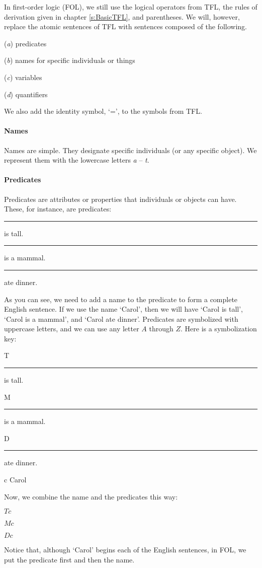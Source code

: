 In first-order logic (FOL), we still use the logical operators from TFL, the rules of derivation given in chapter \ref{s:BasicTFL}, and parentheses. We will, however, replace the atomic sentences of TFL with sentences composed of the following.

\begin{ebullet}
	\item[(\textit{a})] predicates
	\item[(\textit{b})] names for specific individuals or things 
	\item[(\textit{c})] variables 
	\item[(\textit{d})] quantifiers
\end{ebullet}
We also add the identity symbol, ‘=’, to the symbols from TFL.  


\paragraph{Names}

Names are simple. They designate specific individuals (or any specific object). We represent them with the lowercase letters \textit{a} -- \textit{t}.

\paragraph{Predicates}

Predicates are attributes or properties that individuals or objects can have. These, for instance, are predicates:

\begin{ebullet}
	\item[] \rule{1cm}{0.15mm} is tall.
	\item[] \rule{1cm}{0.15mm} is a mammal.
	\item[] \rule{1cm}{0.15mm} ate dinner.
\end{ebullet}

As you can see, we need to add a name to the predicate to form a complete English sentence. If we use the name `Carol’, then we will have ‘Carol is tall’, ‘Carol is a mammal’, and ‘Carol ate dinner’.
Predicates are symbolized with uppercase letters, and we can use any letter $A$ through $Z$. 
Here is a symbolization key:
\begin{ekey}
	\item[T] \rule{1cm}{0.15mm} is tall.
	\item[M] \rule{1cm}{0.15mm} is a mammal.
	\item[D] \rule{1cm}{0.15mm} ate dinner.
	\item[c] Carol
\end{ekey}
 Now, we combine the name and the predicates this way:
\begin{ebullet}
	\item[] $Tc$
	\item[] $Mc$
	\item[] $Dc$
\end{ebullet}
Notice that, although `Carol' begins each of the English sentences, in FOL, we put the predicate first and then the name.

